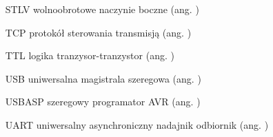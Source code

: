 \begin{itemize}
	\item[STLV] wolnoobrotowe naczynie boczne  ({ang. })
	\item[TCP] protokół sterowania transmisją ({ang. })
	\item[TTL] logika tranzysor-tranzystor ({ang. })
	\item[USB] uniwersalna magistrala szeregowa ({ang. })
	\item[USBASP] szeregowy programator AVR ({ang. })
	\item[UART] uniwersalny asynchroniczny nadajnik odbiornik ({ang. })

\end{itemize}

